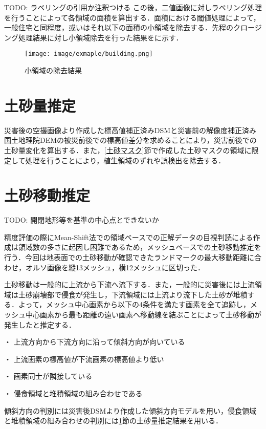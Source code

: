       TODO: ラベリングの引用か注釈つける
      この後，二値画像に対しラベリング処理\cite{}を行うことによって各領域の面積を算出する．面積における閾値処理によって，一般住宅と同程度，或いはそれ以下の面積の小領域を除去する．先程のクロージング処理結果に対し小領域除去を行った結果をに示す．
      
      \begin{figure}[t]
        \centering
        \texttt{[image: image/exmaple/building.png]}
        \caption{小領域の除去結果}
        \label{小領域除去}
      \end{figure}


  \section{土砂量推定}
    \label{土砂量推定}
    災害後の空撮画像より作成した標高値補正済みDSMと災害前の解像度補正済み国土地理院DEMの被災前後での標高値差分を求めることにより，災害前後での土砂量変化を算出する．また，\ref{土砂マスク}節で作成した土砂マスクの領域に限定して処理を行うことにより，植生領域のずれや誤検出を除去する．


  \section{土砂移動推定}
    \label{土砂移動推定}
      TODO: 開閉地形等を基準の中心点とできないか

    精度評価の際にMean-Shift法での領域ベースでの正解データの目視判読による作成は領域数の多さに起因し困難であるため，メッシュベースでの土砂移動推定を行う．今回は地表面での土砂移動が確認できたランドマークの最大移動距離に合わせ，オルソ画像を縦13メッシュ，横12メッシュに区切った．

    土砂移動は一般的に上流から下流へ流下する．また，一般的に災害後には上流領域は土砂崩壊部で侵食が発生し，下流領域には上流より流下した土砂が堆積する．よって，メッシュ中心画素から以下の4条件を満たす画素を全て追跡し，メッシュ中心画素から最も距離の遠い画素へ移動線を結ぶことによって土砂移動が発生したと推定する．

    ・	上流方向から下流方向に沿って傾斜方向が向いている

    ・	上流画素の標高値が下流画素の標高値より低い
    
    ・	画素同士が隣接している
    
    ・	侵食領域と堆積領域の組み合わせである

    傾斜方向の判別には災害後DSMより作成した傾斜方向モデルを用い，侵食領域と堆積領域の組み合わせの判別には\ref{土砂量推定}節の土砂量推定結果を用いる．
  

